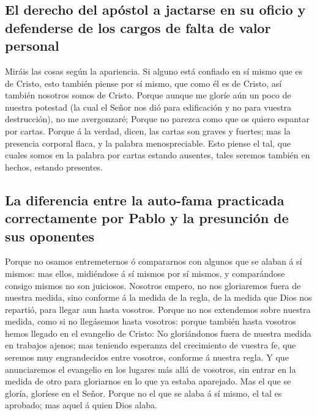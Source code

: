 \hypertarget{el-derecho-del-apuxf3stol-a-jactarse-en-su-oficio-y-defenderse-de-los-cargos-de-falta-de-valor-personal}{%
\subsection{El derecho del apóstol a jactarse en su oficio y defenderse
de los cargos de falta de valor
personal}\label{el-derecho-del-apuxf3stol-a-jactarse-en-su-oficio-y-defenderse-de-los-cargos-de-falta-de-valor-personal}}

 Miráis las cosas según la apariencia. Si alguno está
confiado en sí mismo que es de Cristo, esto también piense por sí mismo,
que como él es de Cristo, así también nosotros somos de Cristo.
 Porque aunque me gloríe aún un poco de nuestra potestad (la
cual el Señor nos dió para edificación y no para vuestra destrucción),
no me avergonzaré;  Porque no parezca como que os quiero
espantar por cartas.  Porque á la verdad, dicen, las cartas
son graves y fuertes; mas la presencia corporal flaca, y la palabra
menospreciable.  Esto piense el tal, que cuales somos en la
palabra por cartas estando ausentes, tales seremos también en hechos,
estando presentes.

\hypertarget{la-diferencia-entre-la-auto-fama-practicada-correctamente-por-pablo-y-la-presunciuxf3n-de-sus-oponentes}{%
\subsection{La diferencia entre la auto-fama practicada correctamente
por Pablo y la presunción de sus
oponentes}\label{la-diferencia-entre-la-auto-fama-practicada-correctamente-por-pablo-y-la-presunciuxf3n-de-sus-oponentes}}

 Porque no osamos entremeternos ó compararnos con algunos
que se alaban á sí mismos: mas ellos, midiéndose á sí mismos por sí
mismos, y comparándose consigo mismos no son juiciosos. 
Nosotros empero, no nos gloriaremos fuera de nuestra medida, sino
conforme á la medida de la regla, de la medida que Dios nos repartió,
para llegar aun hasta vosotros.  Porque no nos extendemos
sobre nuestra medida, como si no llegásemos hasta vosotros: porque
también hasta vosotros hemos llegado en el evangelio de Cristo:
 No gloriándonos fuera de nuestra medida en trabajos
ajenos; mas teniendo esperanza del crecimiento de vuestra fe, que
seremos muy engrandecidos entre vosotros, conforme á nuestra regla.
 Y que anunciaremos el evangelio en los lugares más allá de
vosotros, sin entrar en la medida de otro para gloriarnos en lo que ya
estaba aparejado.  Mas el que se gloría, gloríese en el
Señor.  Porque no el que se alaba á sí mismo, el tal es
aprobado; mas aquel á quien Dios alaba.

